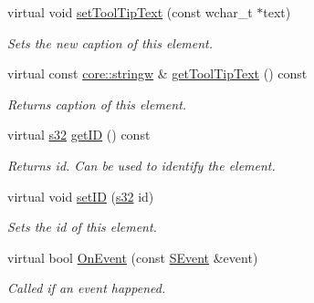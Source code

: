 \begin{DoxyCompactItemize}
virtual void \hyperlink{classirr_1_1gui_1_1IGUIElement_a672f29f88c8d8f1e8ed1ac6c9f23b890}{set\+Tool\+Tip\+Text} (const wchar\+\_\+t $\ast$text)
\begin{DoxyCompactList}\small\item\em Sets the new caption of this element. \end{DoxyCompactList}\item 
\mbox{\label{classirr_1_1gui_1_1IGUIElement_a9c19741dd210443b750e02ef7d639cf8}} 
virtual const \hyperlink{namespaceirr_1_1core_a5aedb62cb47cf01d1c548ab5e6344d2d}{core\+::stringw} \& \hyperlink{classirr_1_1gui_1_1IGUIElement_a9c19741dd210443b750e02ef7d639cf8}{get\+Tool\+Tip\+Text} () const
\begin{DoxyCompactList}\small\item\em Returns caption of this element. \end{DoxyCompactList}\item 
\mbox{\label{classirr_1_1gui_1_1IGUIElement_af838c5de4a09e09a89de74d67d07d80c}} 
virtual \hyperlink{namespaceirr_ac66849b7a6ed16e30ebede579f9b47c6}{s32} \hyperlink{classirr_1_1gui_1_1IGUIElement_af838c5de4a09e09a89de74d67d07d80c}{get\+ID} () const
\begin{DoxyCompactList}\small\item\em Returns id. Can be used to identify the element. \end{DoxyCompactList}\item 
\mbox{\label{classirr_1_1gui_1_1IGUIElement_a55bad0e14306765e1fb734c56b729ba4}} 
virtual void \hyperlink{classirr_1_1gui_1_1IGUIElement_a55bad0e14306765e1fb734c56b729ba4}{set\+ID} (\hyperlink{namespaceirr_ac66849b7a6ed16e30ebede579f9b47c6}{s32} id)
\begin{DoxyCompactList}\small\item\em Sets the id of this element. \end{DoxyCompactList}\item 
\mbox{\label{classirr_1_1gui_1_1IGUIElement_a54b1799e21722d9e6ce5b8e4bdb2e80a}} 
virtual bool \hyperlink{classirr_1_1gui_1_1IGUIElement_a54b1799e21722d9e6ce5b8e4bdb2e80a}{On\+Event} (const \hyperlink{structirr_1_1SEvent}{S\+Event} \&event)
\begin{DoxyCompactList}\small\item\em Called if an event happened. \end{DoxyCompactList}\item 

\end{DoxyCompactItemize}
